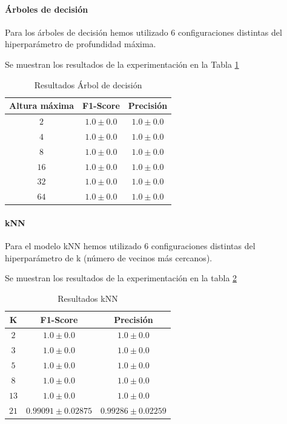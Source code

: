 \documentclass[12pt]{article}
\begin{document}
\paragraph{Árboles de decisión}
Para los árboles de decisión hemos utilizado 6 configuraciones distintas del hiperparámetro de profundidad máxima.

Se muestran los resultados de la experimentación en la Tabla \ref{Tab:DecisionTree}

\begin{table}[h!]
	\caption{Resultados Árbol de decisión}
	\centering
		 \begin{tabular}{||c c c||}
			 \hline
			 Altura máxima & F1-Score & Precisión  \\ [0.5ex]
			 \hline\hline
			 $2$ & $1.0 \pm 0.0$ & $1.0 \pm 0.0$ \\
			 \hline
			 $4$ & $1.0 \pm 0.0$ & $1.0 \pm 0.0$ \\
			 \hline
			 $8$ & $1.0 \pm 0.0$ & $1.0 \pm 0.0$ \\
			 \hline
			 $16$ & $1.0 \pm 0.0$ & $1.0 \pm 0.0$ \\
			 \hline
			 $32$ & $1.0 \pm 0.0$ & $1.0 \pm 0.0$ \\
			 \hline
			 $64$ & $1.0 \pm 0.0$ & $1.0 \pm 0.0$ \\
			 \hline
		 \end{tabular}
	\label{Tab:DecisionTree}
\end{table}

\paragraph{kNN}
Para el modelo kNN hemos utilizado 6 configuraciones distintas del hiperparámetro de k (número de vecinos más cercanos).

Se muestran los resultados de la experimentación en la tabla \ref{Tab:kNN}

\begin{table}[h!]
	\caption{Resultados kNN}
	\centering
		 \begin{tabular}{||c c c||}
			 \hline
			 K & F1-Score & Precisión  \\ [0.5ex]
			 \hline\hline
			 $2$ & $1.0 \pm 0.0$ & $1.0 \pm 0.0$ \\
			 \hline
			 $3$ & $1.0 \pm 0.0$ & $1.0 \pm 0.0$ \\
			 \hline
			 $5$ & $1.0 \pm 0.0$ & $1.0 \pm 0.0$ \\
			 \hline
			 $8$ & $1.0 \pm 0.0$ & $1.0 \pm 0.0$ \\
			 \hline
			 $13$ & $1.0 \pm 0.0$ & $1.0 \pm 0.0$ \\
			 \hline
			 $21$ & $0.99091 \pm 0.02875$ & $0.99286 \pm 0.02259$ \\
			 \hline
		 \end{tabular}
	\label{Tab:kNN}
\end{table}
\end{document}
